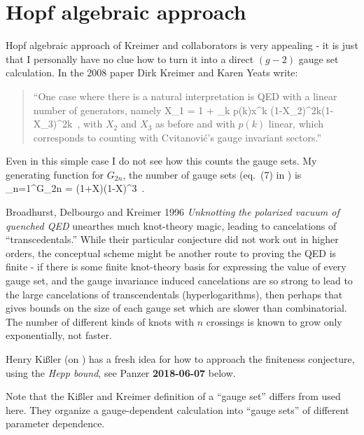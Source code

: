 \section{Hopf algebraic approach}
\label{sect:HopfAlgebra}

Hopf algebraic approach of Kreimer and collaborators is very appealing - it is just that I
personally have no clue how to turn it into a direct $(g-2)$ gauge set
calculation. In the 2008 paper
 {Dirk Kreimer} and
{Karen Yeats} write:
    \begin{quote}
``One case where there is a natural interpretation is QED with a linear
number of generators, namely
\beq
X_1 = 1 + \sum_{k }p(k)x^k
           {(1-X_2)^{2k}(1-X_3)^{2k}}
\,,
with $X_2$ and $X_3$ as before and with $p(k)$ linear, which corresponds
to counting with Cvitanovi\'c's gauge invariant sectors.''
    \end{quote}
Even in this simple case I do not see how this counts the gauge sets. My
generating function for $G_{2n}$, the number of gauge sets
(eq.~(7) in )  is
\beq
\sum_{n=1}^\infty G_{2n}
    =
           {(1+X)(1-X)^{3}}
\,.

Broadhurst, Delbourgo and Kreimer 1996 {\em Unknotting the
polarized vacuum of quenched {QED}} unearthes much knot-theory magic,
leading to cancelations of ``transcedentals.'' While their
particular conjecture did not work out
in higher orders, the conceptual scheme might be another
route to proving the QED is finite - if there is some finite knot-theory
basis for expressing the value of every gauge set, and the gauge
invariance induced cancelations are so strong to lead to the large
cancelations of transcendentals (hyperlogarithms), then perhaps that
gives bounds on the size of each gauge set which are slower than
combinatorial. The number of different kinds of knots with $n$ crossings
is known to grow only exponentially, not faster.

Henry Ki{\ss}ler (on ) has a fresh idea for how to
approach the finiteness conjecture, using the \emph{Hepp bound},
see Panzer {\bf 2018-06-07} below.

Note that the Ki{\ss}ler and Kreimer definition of a ``gauge
set'' differs from  used here. They organize a
gauge-dependent calculation into ``gauge sets'' of different parameter
dependence.

